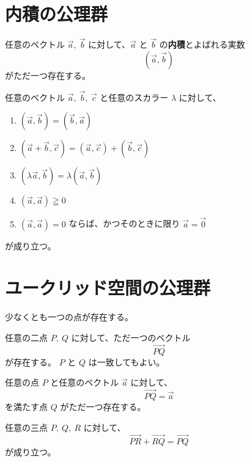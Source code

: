 \section{内積の公理群}

\begin{axm}\label{axiom:7}
  任意のベクトル \(\vec{a},\ \vec{b}\) に対して、\(\vec{a}\) と \(\vec{b}\) の\textbf{内積}とよばれる実数
  \[(\vec{a},\vec{b})\]
  がただ一つ存在する。
\end{axm}

\begin{axm}\label{axiom:8}
  任意のベクトル \(\vec{a},\ \vec{b},\ \vec{c}\) と任意のスカラー \(\lambda\) に対して、
  \begin{enumerate}
    \item \((\vec{a},\vec{b})=(\vec{b},\vec{a})\)
    \item \((\vec{a}+\vec{b},\vec{c})=(\vec{a},\vec{c})+(\vec{b},\vec{c})\)
    \item \((\lambda\vec{a},\vec{b})=\lambda(\vec{a},\vec{b})\)
    \item \((\vec{a},\vec{a})\geqq0\)
    \item \((\vec{a},\vec{a})=0\) ならば、かつそのときに限り \(\vec{a}=\vec{0}\)
  \end{enumerate}
  が成り立つ。
\end{axm}

\section{ユークリッド空間の公理群}

\begin{axm}\label{axiom:9}
  少なくとも一つの点が存在する。
\end{axm}

\begin{axm}\label{axiom:10}
  任意の二点 \(P,\ Q\) に対して、ただ一つのベクトル
  \[\overrightarrow{PQ}\]
  が存在する。
  \(P\) と \(Q\) は一致してもよい。
\end{axm}

\begin{axm}\label{axiom:11}
  任意の点 \(P\) と任意のベクトル \(\vec{a}\) に対して、
  \[\overrightarrow{PQ}=\vec{a}\]
  を満たす点 \(Q\) がただ一つ存在する。
\end{axm}

\begin{axm}\label{axiom:12}
  任意の三点 \(P,\ Q,\ R\) に対して、
  \[\overrightarrow{PR}+\overrightarrow{RQ}=\overrightarrow{PQ}\]
  が成り立つ。
\end{axm}

